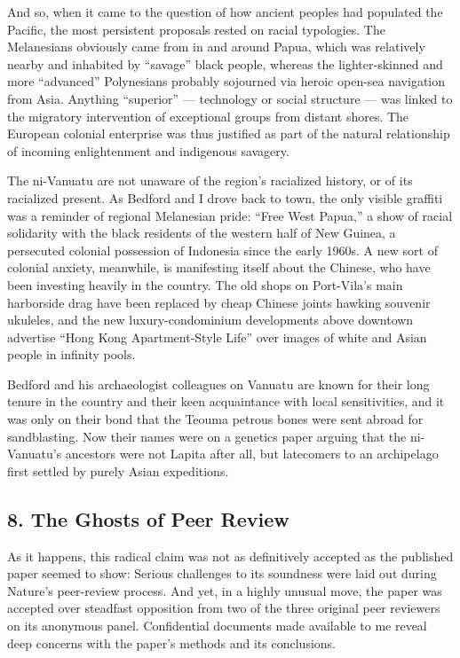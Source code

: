 And so, when it came to the question of how ancient peoples had
populated the Pacific, the most persistent proposals rested on racial
typologies. The Melanesians obviously came from in and around Papua,
which was relatively nearby and inhabited by ``savage'' black people,
whereas the lighter-skinned and more ``advanced'' Polynesians probably
sojourned via heroic open-sea navigation from Asia. Anything
``superior'' --- technology or social structure --- was linked to the
migratory intervention of exceptional groups from distant shores. The
European colonial enterprise was thus justified as part of the natural
relationship of incoming enlightenment and indigenous savagery.

The ni-Vanuatu are not unaware of the region's racialized history, or of
its racialized present. As Bedford and I drove back to town, the only
visible graffiti was a reminder of regional Melanesian pride: ``Free
West Papua,'' a show of racial solidarity with the black residents of
the western half of New Guinea, a persecuted colonial possession of
Indonesia since the early 1960s. A new sort of colonial anxiety,
meanwhile, is manifesting itself about the Chinese, who have been
investing heavily in the country. The old shops on Port-Vila's main
harborside drag have been replaced by cheap Chinese joints hawking
souvenir ukuleles, and the new luxury-condominium developments above
downtown advertise ``Hong Kong Apartment-Style Life'' over images of
white and Asian people in infinity pools.

Bedford and his archaeologist colleagues on Vanuatu are known for their
long tenure in the country and their keen acquaintance with local
sensitivities, and it was only on their bond that the Teouma petrous
bones were sent abroad for sandblasting. Now their names were on a
genetics paper arguing that the ni-Vanuatu's ancestors were not Lapita
after all, but latecomers to an archipelago first settled by purely
Asian expeditions.

\hypertarget{8-the-ghosts-of-peer-review}{%
\subsection{\texorpdfstring{\textbf{8. The Ghosts of Peer
Review}}{8. The Ghosts of Peer Review}}\label{8-the-ghosts-of-peer-review}}

As it happens, this radical claim was not as definitively accepted as
the published paper seemed to show: Serious challenges to its soundness
were laid out during Nature's peer-review process. And yet, in a highly
unusual move, the paper was accepted over steadfast opposition from two
of the three original peer reviewers on its anonymous panel.
Confidential documents made available to me reveal deep concerns with
the paper's methods and its conclusions.

